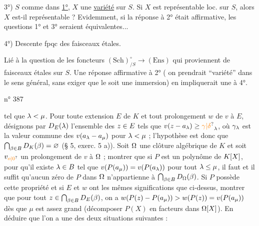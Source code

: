 
3°) $S$ comme dans \uline{1°}, $X$ une \uline{variété}  sur $S$. Si $X$ est représentable loc.  sur $S$,  alors $X$ est-il représentable ? Evidemment, si la réponse à 2°  était affirmative, les questions 1° et 3° seraient équivalentes...


4°) Descente fpqc des  faisceaux étales.

Lié à la question de  les foncteurs $(\mathrm{Sch})_{/S}^{\circ}\to(\mathrm{Ens})$ qui proviennent de  faisceaux étales sur $S$. Une réponse affirmative à 2° ( on prendrait ``variété'' dans le sens général, sans exiger que le   soit une immersion) en impliquerait une à 4°.


\hfill n° 387

tel que $\lambda<\mu$. Pour toute extension $E$ de $K$ et tout prolongement $w$ de $v$ à $E$, désignons par $D_E(\lambda)$ l'ensemble des $z\in E$ tels que $v(z-a_{\handwritten{\lambda}})\handwritten{\geq\unsure{\gamma|\delta}_{\lambda}}$, où $\gamma_\lambda$ est la valeur commune des $v(a_{\lambda}-a_\mu)$ pour $\lambda<\mu$ ; l'hypothèse est donc que $\bigcap_{\beta\in B}D_K(\beta)=\varnothing$ (§ 5, exerc. 5 a)). Soit $\Omega$ une clôture algébrique de $K$ et soit $v_{\unsure{o|0}}$ un prolongement de $v$ à $\Omega$ ; montrer que si $P$ est un polynôme de $K[X]$, pour qu'il existe $\lambda\in B$ tel que $v(P(a_\mu))=v(P(a_{\lambda}))$ pour tout $\lambda\leq\mu$, il faut et il suffit qu'aucun zéro de $P$ dans $\Omega$ n'appartienne à $\bigcap_{\beta\in B}D_{\Omega}(\beta)$. Si $P$ possède cette propriété et si $E$ et $w$ ont les mêmes significations que ci-dessus, montrer que pour tout $z\in\bigcap_{\beta\in B}D_E(\beta)$, on a $w(P(z)-P(a_\mu))>w(P(z))=v(P(a_\mu))$ dès que $\mu$ est assez grand (décomposer $P(X)$ en facteurs dans $\Omega[X]$). En déduire que l'on a une des deux situations suivantes :

